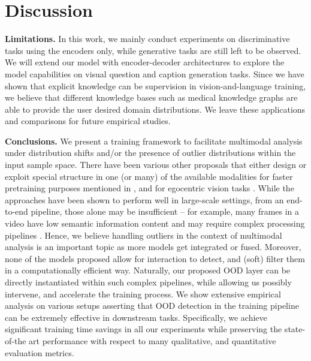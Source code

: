 \documentclass{article}
\begin{document}
\section{Discussion}
\textbf{Limitations. } In this work, we mainly conduct experiments on discriminative tasks using the encoders only, while generative tasks are still left to be observed. We will extend our model with encoder-decoder architectures to explore the model capabilities on visual question and caption generation tasks. Since we have shown that explicit knowledge can be supervision in vision-and-language training, we believe that different knowledge bases such as medical knowledge graphs are able to provide the user desired domain distributions. We leave these applications and comparisons for future empirical studies. 

\textbf{Conclusions. } We present a training framework to facilitate multimodal analysis under distribution shifts and/or the presence of outlier distributions within the input sample space. There have been various other proposals that either design or exploit special structure in one (or many) of the available modalities for faster pretraining purposes mentioned in \cite {wang2021simvlm}, and for egocentric vision tasks \cite{zeng2022socratic}. While the approaches have been shown to perform well in large-scale settings, from an end-to-end pipeline, those alone may be insufficient -- for example, many frames in a video have low semantic information content and may require complex processing pipelines \cite{cavallaro2005semantic}.  Hence, we believe handling outliers in the context of multimodal analysis is an important topic as more models get integrated or fused. Moreover, none of the models proposed allow for interaction to detect, and (soft) filter them in a computationally efficient way. Naturally, our proposed OOD layer can be directly instantiated within such complex pipelines, while allowing us possibly intervene, and accelerate the training process. We show extensive empirical analysis on various setups asserting that OOD detection in the training pipeline can be extremely effective in downstream tasks. Specifically, we achieve significant training time savings in all our experiments while preserving the state-of-the art performance with respect to many qualitative, and quantitative evaluation metrics.



\medskip


\newpage


\end{document}
